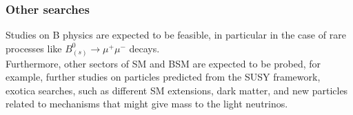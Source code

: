 \subsubsection{Other searches}
Studies on B physics are expected to be feasible, in particular in the case of rare processes like $B^0_{(s)}\longrightarrow \mu^+ \mu^-$ decays.\\
Furthermore, other sectors of SM and BSM are expected to be probed, for example, further studies on particles predicted from the SUSY framework, exotica searches, such as different SM extensions, dark matter, and new particles related to mechanisms that might give mass to the light neutrinos.\\

